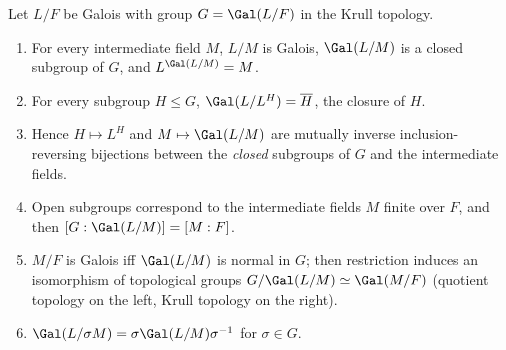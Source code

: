 \begin{theorem}\label{thm:galois:krull}
Let $L/F$ be Galois with group $G=\Gal(L/F)$ in the Krull topology.
\begin{enumerate}[label=(\alph*)]
\item For every intermediate field $M$, $L/M$ is Galois, $\Gal(L/M)$ is a closed subgroup of $G$, and $L^{\Gal(L/M)}=M$.
\item For every subgroup $H\le G$, $\Gal(L/L^H)=\overline H$, the closure of $H$.
\item Hence $H\mapsto L^H$ and $M\mapsto\Gal(L/M)$ are mutually inverse inclusion-reversing bijections between the \emph{closed} subgroups of $G$ and the
intermediate fields.
\item Open subgroups correspond to the intermediate fields $M$ finite over $F$, and then $[G:\Gal(L/M)]=[M:F]$.
\item $M/F$ is Galois iff $\Gal(L/M)$ is normal in $G$; then restriction induces an isomorphism of topological groups $G/\Gal(L/M)\simeq\Gal(M/F)$ (quotient
topology on the left, Krull topology on the right).
\item $\Gal(L/\sigma M)=\sigma\Gal(L/M)\sigma^{-1}$ for $\sigma\in G$.
\end{enumerate}
\end{theorem}

